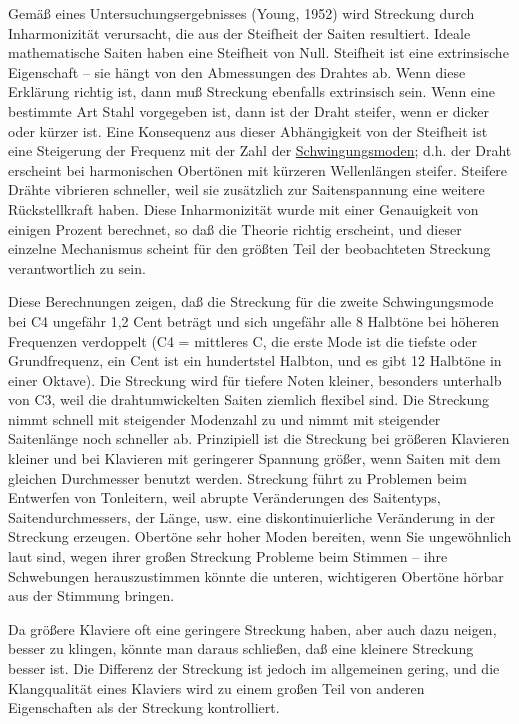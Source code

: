 Gemäß eines Untersuchungsergebnisses (Young, 1952) wird Streckung durch Inharmonizität verursacht, die aus der Steifheit der Saiten resultiert.
Ideale mathematische Saiten haben eine Steifheit von Null.
Steifheit ist eine extrinsische Eigenschaft -- sie hängt von den Abmessungen des Drahtes ab.
Wenn diese Erklärung richtig ist, dann muß Streckung ebenfalls extrinsisch sein.
Wenn eine bestimmte Art Stahl vorgegeben ist, dann ist der Draht steifer, wenn er dicker oder kürzer ist.
Eine Konsequenz aus dieser Abhängigkeit von der Steifheit ist eine Steigerung der Frequenz mit der Zahl der \hyperref[moden]{Schwingungsmoden}; d.h. der Draht erscheint bei harmonischen Obertönen mit kürzeren Wellenlängen steifer.
Steifere Drähte vibrieren schneller, weil sie zusätzlich zur Saitenspannung eine weitere Rückstellkraft haben.
Diese Inharmonizität wurde mit einer Genauigkeit von einigen Prozent berechnet, so daß die Theorie richtig erscheint, und dieser einzelne Mechanismus scheint für den größten Teil der beobachteten Streckung verantwortlich zu sein.

Diese Berechnungen zeigen, daß die Streckung für die zweite Schwingungsmode bei C4 ungefähr 1,2 Cent beträgt und sich ungefähr alle 8 Halbtöne bei höheren Frequenzen verdoppelt (C4 = mittleres C, die erste Mode ist die tiefste oder Grundfrequenz, ein Cent ist ein hundertstel Halbton, und es gibt 12 Halbtöne in einer Oktave).
Die Streckung wird für tiefere Noten kleiner, besonders unterhalb von C3, weil die drahtumwickelten Saiten ziemlich flexibel sind.
Die Streckung nimmt schnell mit steigender Modenzahl zu und nimmt mit steigender Saitenlänge noch schneller ab.
Prinzipiell ist die Streckung bei größeren Klavieren kleiner und bei Klavieren mit geringerer Spannung größer, wenn Saiten mit dem gleichen Durchmesser benutzt werden.
Streckung führt zu Problemen beim Entwerfen von Tonleitern, weil abrupte Veränderungen des Saitentyps, Saitendurchmessers, der Länge, usw. eine diskontinuierliche Veränderung in der Streckung erzeugen.
Obertöne sehr hoher Moden bereiten, wenn Sie ungewöhnlich laut sind, wegen ihrer großen Streckung Probleme beim Stimmen -- ihre Schwebungen herauszustimmen könnte die unteren, wichtigeren Obertöne hörbar aus der Stimmung bringen.

Da größere Klaviere oft eine geringere Streckung haben, aber auch dazu neigen, besser zu klingen, könnte man daraus schließen, daß eine kleinere Streckung besser ist.
Die Differenz der Streckung ist jedoch im allgemeinen gering, und die Klangqualität eines Klaviers wird zu einem großen Teil von anderen Eigenschaften als der Streckung kontrolliert.

